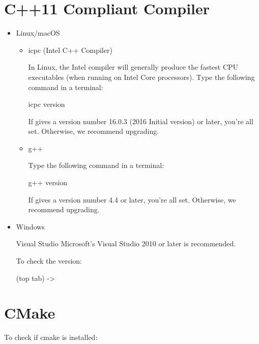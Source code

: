 \documentclass[letterpaper,10pt,english]{sphinxmanual}
\begin{document}
\section{C++11 Compliant Compiler}
\label{\detokenize{software_requirements:c-11-compliant-compiler}}\begin{itemize}
\item {} 
Linux/macOS
\begin{itemize}
\item {} 
icpc (Intel C++ Compiler)

In Linux, the Intel compiler will generally produce the fastest CPU executables (when running on Intel Core processors). Type the following command in a terminal:

%
\begin{sphinxVerbatim}[commandchars=\\\{\}]
\PYGZdl{} icpc \PYGZhy{}\PYGZhy{}version
\end{sphinxVerbatim}

If gives a version number 16.0.3 (2016 Initial version) or later, you’re all set. Otherwise, we recommend upgrading.

\item {} 
g++

Type the following command in a terminal:

%
\begin{sphinxVerbatim}[commandchars=\\\{\}]
\PYGZdl{} g++ \PYGZhy{}\PYGZhy{}version
\end{sphinxVerbatim}

If gives a version number 4.4 or later, you’re all set. Otherwise, we recommend upgrading.

\end{itemize}

\item {} 
Windows

Visual Studio Microsoft’s Visual Studio 2010 or later is recommended.

To check the version:

 (top tab) -\textgreater{} 

\noindent{}

\noindent{}

\end{itemize}


\section{CMake}
\label{\detokenize{software_requirements:cmake}}
To check if cmake is installed:
\end{document}
